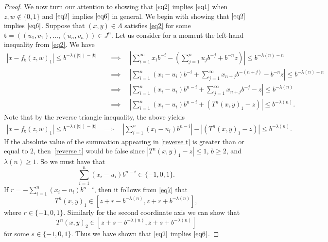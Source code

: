 \documentclass[12pt]{article}
\theoremstyle{remark}
\numberwithin{equation}{section}
\newcommand{\bt}{\mathbf{t}}
\newcommand{\0}{\mathbf{0}}
\begin{document}
\begin{proof}
We now turn our attention to showing that $\eqref{eq2}$ implies $\eqref{eq1}$ when $z,w\not\in\{0,1\}$ and $\eqref{eq2}$ implies $\eqref{eq6}$ in general. We begin with showing that $\eqref{eq2}$ implies $\eqref{eq6}$. Suppose that \mbox{$(x,y)\in \Lambda$} satisfies \eqref{eq2} for some $\bt=((u_{1},v_{1}),\dots , (u_{n},v_{n})) \in J^{n}$. Let us consider for a moment the left-hand inequality from \eqref{eq2}. We have 
\begin{align}
\left| x-f_{\bt}(z,w)_{1}\right| \leq b^{-\lambda(|\bt|)-|\bt|} \quad &\implies \quad \left| \sum_{i=1}^{\infty}x_{i}b^{-i} - \left( \sum_{j=1}^{n}u_{j}b^{-{j}} + b^{-n}z \right) \right| \leq b^{-\lambda(n)-n} \nonumber\\
&\implies \quad \left| \sum_{i=1}^{n}(x_{i}-u_{i})b^{-i} +  \sum_{j=1}^{\infty}x_{n+j}b^{-(n+j)}-b^{-n}z  \right| \leq b^{-\lambda(n)-n} \nonumber\\
&\implies \quad  \left| \sum_{i=1}^{n}(x_{i}-u_{i})b^{n-i} + \sum_{j=1}^{\infty}x_{n+j}b^{-j} -z  \right| \leq b^{-\lambda(n)} \nonumber\\
&\implies \quad  \left| \sum_{i=1}^{n}(x_{i}-u_{i})b^{n-i} + \left(T^{n}(x,y)_{1}-z\right) \right| \leq b^{-\lambda(n)}. \label{eq7}
\end{align}
Note that by the reverse triangle inequality, the above yields
\begin{align}
    \left| x-f_{\bt}(z,w)_{1}\right| \leq b^{-\lambda(|\bt|)-|\bt|} &\implies \quad  \left| \sum_{i=1}^{n}(x_{i}-u_{i})b^{n-i}\right| - \left|\left(T^{n}(x,y)_{1}-z\right) \right| \leq b^{-\lambda(n)}. \label{reverse t}
\end{align}
If the absolute value of the summation appearing in {\eqref{reverse t} is} greater than or equal to $2$, {then~\eqref{reverse t}} would be false since $|T^{n}(x,y)_{1}-z|\leq1${, $b \geq 2$,} and $\lambda(n)\geq1$. So we must have that
\begin{equation} \label{summation}
\sum_{i=1}^{n}(x_{i}-u_{i})b^{n-i} \in \{-1,0,1\}.
\end{equation}
If $r=-\sum_{i=1}^{n}(x_{i}-u_{i})b^{n-i}$, then it follows from \eqref{eq7} that 
\begin{equation} \label{what we are left with}
    T^n(x,y)_1\in[z+r-b^{-\lambda(n)},z+r+b^{-\lambda(n)}],
\end{equation}
{where $r \in \{-1,0,1\}$.}
Similarly for the second coordinate axis we can show that 
$$T^n(x,y)_2\in [z+s-b^{-\lambda(n)},z+s+b^{-\lambda(n)}]$$
for some $s\in\{-1,0,1\}$. Thus we have {shown that} $\eqref{eq2}$ implies $\eqref{eq6}$.


\end{proof}
\end{document}
